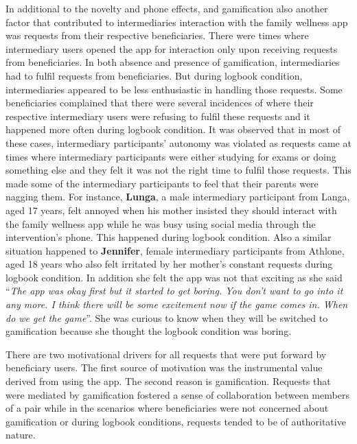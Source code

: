 In additional to the novelty and phone effects, and gamification also another factor that contributed to intermediaries interaction with the family wellness app was requests from their respective beneficiaries. There were times where intermediary users opened the app for interaction only upon receiving requests from beneficiaries. In both absence and presence of gamification, intermediaries had to fulfil requests from beneficiaries.  But during logbook condition, intermediaries appeared to be less enthusiastic in handling those requests. Some beneficiaries complained that there were several incidences of where their respective intermediary users were refusing to fulfil these requests and it happened more often during logbook condition. It was observed that in most of these cases, intermediary participants' autonomy was violated as requests came at times where intermediary participants were either studying for exams or doing something else and they felt it was not the right time to fulfil those requests. This made some of the intermediary participants to feel that their parents were nagging them. For instance, \textbf{Lunga}, a male intermediary participant from Langa, aged 17 years, felt annoyed when his mother insisted they should interact with the family wellness app while he was busy using social media through the intervention's phone. This happened during logbook condition. Also a similar situation happened to \textbf{Jennifer}, female intermediary participants from Athlone, aged 18 years who also felt irritated by her mother's constant requests during logbook condition. In addition she felt the app was not that exciting as she said ``\emph{The app was okay first but it started to get boring. You don't want to go into it any more. I think there will be some excitement now if the game comes in. When do we get the game}''. She was curious to know when they will be switched to gamification because she thought the logbook condition was boring.

There are two motivational drivers for all requests that were put forward by beneficiary users. The first source of motivation was the instrumental value derived from using the app. The second reason is gamification. Requests that were mediated by gamification fostered a sense of collaboration between members of a pair while in the scenarios where beneficiaries were not concerned about gamification or during logbook conditions, requests tended to be of authoritative nature.


